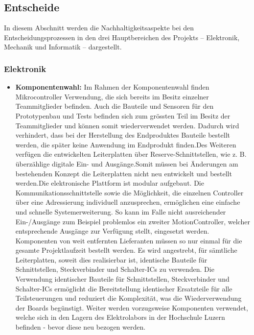 \documentclass[../../main.tex]{subfiles} %
\begin{document}
\subsection{Entscheide}

In diesem Abschnitt werden die Nachhaltigkeitsaspekte bei den
Entscheidungsprozessen in den drei Hauptbereichen des Projekts – Elektronik,
Mechanik und Informatik – dargestellt.

\subsubsection{Elektronik}

\begin{itemize}
  \item \textbf{Komponentenwahl:} Im Rahmen der Komponentenwahl finden Mikrocontroller Verwendung,
        die sich bereits im Besitz einzelner Teammitglieder befinden. Auch die Bauteile und Sensoren für
        den Prototypenbau und Tests befinden sich zum grössten Teil im Besitz der Teammitglieder und
        können somit wiederverwendet werden. Dadurch wird verhindert, dass bei der Herstellung des
        Endproduktes Bauteile bestellt werden, die später keine Anwendung im Endprodukt finden.Des
        Weiteren verfügen die entwickelten Leiterplatten über Reserve-Schnittstellen, wie z. B.
        überzählige digitale Ein- und Ausgänge.Somit müssen bei Änderungen am bestehenden Konzept die Leiterplatten
        nicht neu entwickelt und bestellt werden.Die elektronische Plattform ist modular aufgebaut. Die
        Kommunikationsschnittstelle sowie die Möglichkeit, die einzelnen Controller über eine Adressierung
        individuell anzusprechen, ermöglichen eine einfache und schnelle Systemerweiterung. So kann im Falle nicht ausreichender
        Ein-/Ausgänge zum Beispiel problemlos ein zweiter MotionController, welcher entsprechende Ausgänge zur Verfügung stellt,
        eingesetzt werden. Komponenten von weit entfernten Lieferanten müssen so nur einmal für die 
        gesamte Projektlaufzeit bestellt werden. Es wird angestrebt, für sämtliche Leiterplatten, soweit 
        dies realisierbar ist, identische Bauteile für Schnittstellen, Steckverbinder und Schalter-ICs zu 
        verwenden. Die Verwendung identischer Bauteile für Schnittstellen, Steckverbinder und Schalter-ICs 
        ermöglicht die Bereitstellung identischer Ersatzteile für alle Teilsteuerungen und reduziert 
        die Komplexität, was die Wiederverwendung der Boards begünstigt.
        Weiter werden vorzugsweise Komponenten verwendet, welche sich in den Lagern des Elektrolabors in der 
        Hochschule Luzern befinden - bevor diese neu bezogen werden. 


\end{itemize}
\end{document}
